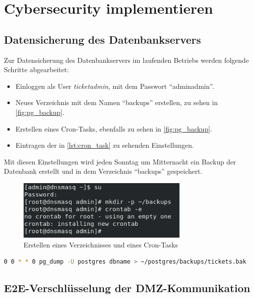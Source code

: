 \documentclass[a4paper,
    11pt,
    headings=small,
    ngerman,
    listof=totoc,
    numbers=noenddot]{scrreprt}[2021/11/13]
\begin{document}
\section{Cybersecurity implementieren}

\subsection{Datensicherung des Datenbankservers}

Zur Datensicherung des Datenbankservers im laufenden Betriebs werden folgende Schritte abgearbeitet:

\begin{itemize}
  \item Einloggen als User \textit{ticketadmin}, mit dem Passwort \enquote{adminadmin}.
  \item Neues Verzeichnis mit dem Namen \enquote{backups} erstellen, zu sehen in \vref{fig:pg_backup}.
  \item Erstellen eines Cron-Tasks, ebenfalls zu sehen in \vref{fig:pg_backup}.
  \item Eintragen der in \vref{lst:cron_task} zu sehenden Einstellungen.
\end{itemize}

Mit diesen Einstellungen wird jeden Sonntag um Mitternacht ein Backup der Datenbank erstellt und in dem Verzeichnis \enquote{backups} gespeichert.

\begin{figure}[htbp]
  \centering
  \includegraphics[width=0.75\textwidth]{data/postgres_backup.png}
  \caption{Erstellen eines Verzeichnisses und eines Cron-Tasks}
  \label{fig:pg_backup}
\end{figure}

\begin{lstlisting}[language=bash,caption={Einrichtung eines Cron-Tasks},label={lst:cron_task}]
  0 0 * * 0 pg_dump -U postgres dbname > ~/postgres/backups/tickets.bak
\end{lstlisting}


\subsection{E2E-Verschlüsselung der DMZ-Kommunikation}
\end{document}
